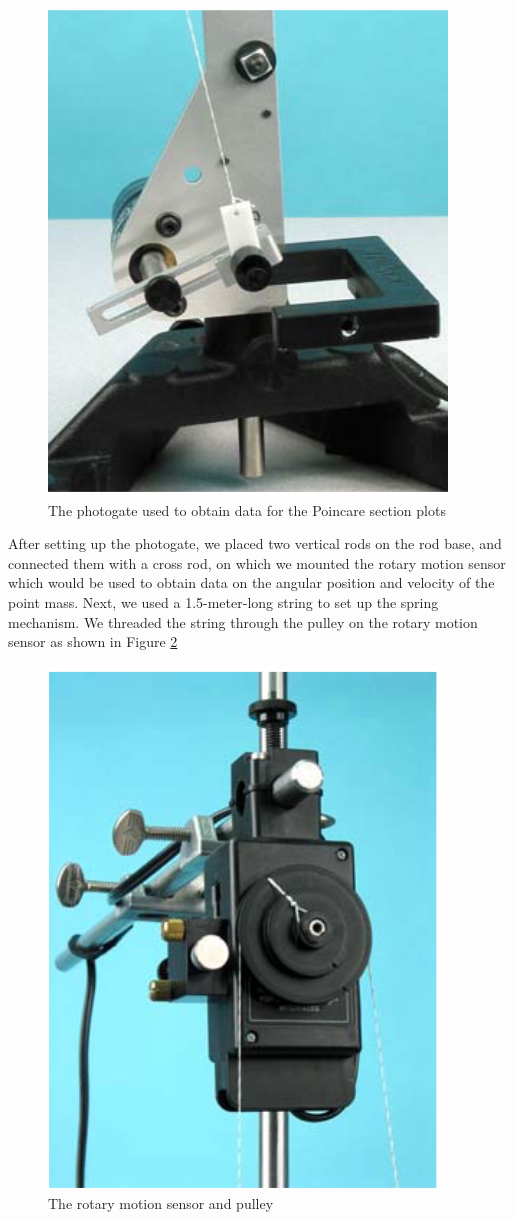 \documentclass[twocolumn,amsmath,amssymb,pra, floatfix]{revtex4-2}
\begin{document}
\begin{figure}[H]
    \centering
    \includegraphics[width = 0.5\linewidth]{images/photogate.png}
    \caption{The photogate used to obtain data for the Poincare section plots}
    \label{fig: photogate}
\end{figure}

After setting up the photogate, we placed two vertical rods on the rod base, and connected them with a cross rod, on which we mounted the rotary motion sensor which would be used to obtain data on the angular position and velocity of the point mass. Next, we used a 1.5-meter-long string to set up the spring mechanism. We threaded the string through the pulley on the rotary motion sensor as shown in Figure \ref{fig: rotary motion sensor and pulley}

\begin{figure}[H]
    \centering
    \includegraphics[width = 0.5\linewidth]{images/rotary_motion_sensor.png}
    \caption{The rotary motion sensor and pulley}
    \label{fig: rotary motion sensor and pulley}
\end{figure}
\end{document}
